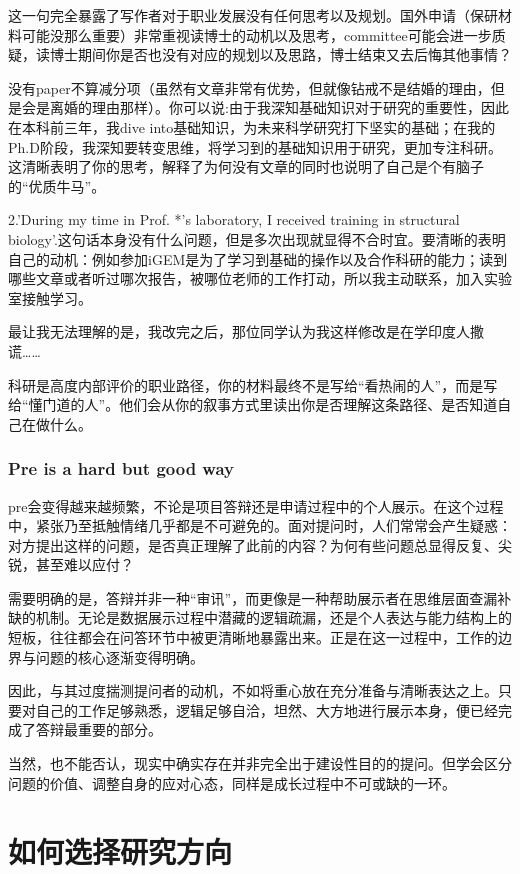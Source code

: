 这一句完全暴露了写作者对于职业发展没有任何思考以及规划。国外申请（保研材料可能没那么重要）非常重视读博士的动机以及思考，committee可能会进一步质疑，读博士期间你是否也没有对应的规划以及思路，博士结束又去后悔其他事情？

没有paper不算减分项（虽然有文章非常有优势，但就像钻戒不是结婚的理由，但是会是离婚的理由那样）。你可以说:由于我深知基础知识对于研究的重要性，因此在本科前三年，我dive into基础知识，为未来科学研究打下坚实的基础；在我的Ph.D阶段，我深知要转变思维，将学习到的基础知识用于研究，更加专注科研。这清晰表明了你的思考，解释了为何没有文章的同时也说明了自己是个有脑子的“优质牛马”。

2.'During my time in Prof. *’s laboratory, I received training in structural biology'.这句话本身没有什么问题，但是多次出现就显得不合时宜。要清晰的表明自己的动机：例如参加iGEM是为了学习到基础的操作以及合作科研的能力；读到哪些文章或者听过哪次报告，被哪位老师的工作打动，所以我主动联系，加入实验室接触学习。

最让我无法理解的是，我改完之后，那位同学认为我这样修改是在学印度人撒谎……

科研是高度内部评价的职业路径，你的材料最终不是写给“看热闹的人”，而是写给“懂门道的人”。他们会从你的叙事方式里读出你是否理解这条路径、是否知道自己在做什么。
\subsubsection{Pre is a hard but good way}

pre会变得越来越频繁，不论是项目答辩还是申请过程中的个人展示。在这个过程中，紧张乃至抵触情绪几乎都是不可避免的。面对提问时，人们常常会产生疑惑：对方提出这样的问题，是否真正理解了此前的内容？为何有些问题总显得反复、尖锐，甚至难以应付？

需要明确的是，答辩并非一种“审讯”，而更像是一种帮助展示者在思维层面查漏补缺的机制。无论是数据展示过程中潜藏的逻辑疏漏，还是个人表达与能力结构上的短板，往往都会在问答环节中被更清晰地暴露出来。正是在这一过程中，工作的边界与问题的核心逐渐变得明确。

因此，与其过度揣测提问者的动机，不如将重心放在充分准备与清晰表达之上。只要对自己的工作足够熟悉，逻辑足够自洽，坦然、大方地进行展示本身，便已经完成了答辩最重要的部分。

当然，也不能否认，现实中确实存在并非完全出于建设性目的的提问。但学会区分问题的价值、调整自身的应对心态，同样是成长过程中不可或缺的一环。

\section{如何选择研究方向}

